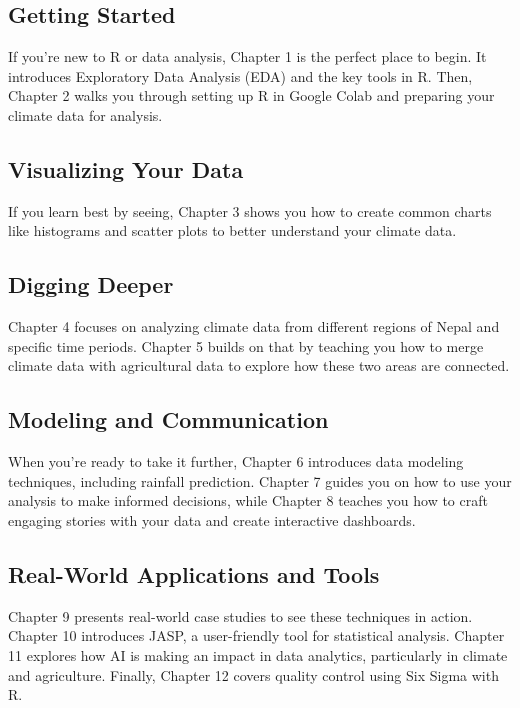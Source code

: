 \subsection*{Getting Started}

If you’re new to R or data analysis, Chapter 1 is the perfect place to begin. It introduces Exploratory Data Analysis (EDA) and the key tools in R. Then, Chapter 2 walks you through setting up R in Google Colab and preparing your climate data for analysis.

\subsection*{Visualizing Your Data}

If you learn best by seeing, Chapter 3 shows you how to create common charts like histograms and scatter plots to better understand your climate data.

\subsection*{Digging Deeper}

Chapter 4 focuses on analyzing climate data from different regions of Nepal and specific time periods. Chapter 5 builds on that by teaching you how to merge climate data with agricultural data to explore how these two areas are connected.

\subsection*{Modeling and Communication}

When you’re ready to take it further, Chapter 6 introduces data modeling techniques, including rainfall prediction. Chapter 7 guides you on how to use your analysis to make informed decisions, while Chapter 8 teaches you how to craft engaging stories with your data and create interactive dashboards.

\subsection*{Real-World Applications and Tools}

Chapter 9 presents real-world case studies to see these techniques in action. Chapter 10 introduces JASP, a user-friendly tool for statistical analysis. Chapter 11 explores how AI is making an impact in data analytics, particularly in climate and agriculture. Finally, Chapter 12 covers quality control using Six Sigma with R.

